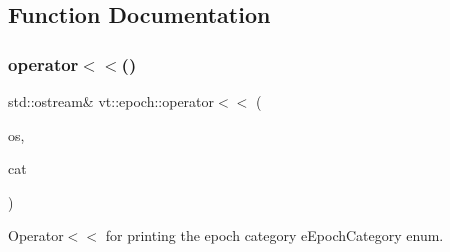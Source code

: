 \subsection{Function Documentation}
\mbox{\label{namespacevt_1_1epoch_ac6e7a477d5b11270b5b1e6f7a70e3bd5}} 
\subsubsection{\texorpdfstring{operator$<$$<$()}{operator<<()}}
{\footnotesize\ttfamily std\+::ostream\& vt\+::epoch\+::operator$<$$<$ (\begin{DoxyParamCaption}\item[{std\+::ostream \&}]{os,  }\item[{\hyperlink{namespacevt_1_1epoch_a956abe0aceef0d10a988de8acb002c7c}{e\+Epoch\+Category} const \&}]{cat }\end{DoxyParamCaption})\hspace{0.3cm}{\ttfamily [inline]}}



Operator$<$$<$ for printing the epoch category {\ttfamily e\+Epoch\+Category} enum. 

